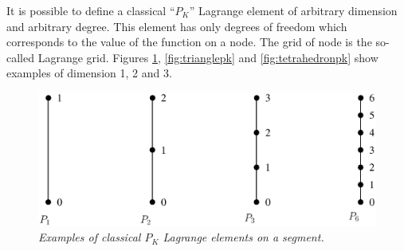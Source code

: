 \documentclass[10pt,a4paper]{article}
\begin{document}
It is possible to define a classical ``$P_K$'' Lagrange element of arbitrary dimension and arbitrary degree. This element has only degrees of freedom which corresponds to the value of the function on a node. The grid of node is the so-called Lagrange grid. Figures \ref{fig:segmentpk}, \ref{fig:trianglepk} and \ref{fig:tetrahedronpk} show examples of dimension 1, 2 and 3.
\begin{figure}[H] 
  \begin{center} 
    \includegraphics[width=14cm,angle=0]{getfemlist_segment_Pk.eps}
    \caption{ \it Examples of classical $P_K$ Lagrange elements on a segment.} \label{fig:segmentpk}
  \end{center}
\end{figure}
\end{document}
